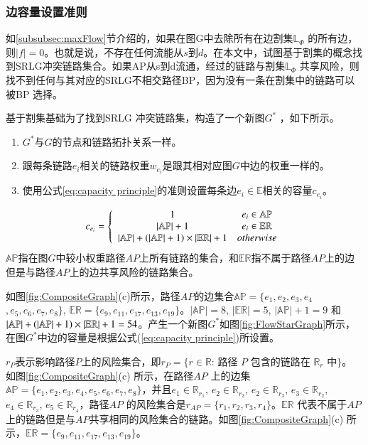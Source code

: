 \subsubsection{边容量设置准则}
如\ref{subsubsec:maxFlow}节介绍的，如果在图G中去除所有在边割集$\mathbb{\mathbb{L}}_{\Phi}$ 的所有边，则$|f| = 0$。也就是说，不存在任何流能从$s$到$d$。在本文中，试图基于割集的概念找到SRLG冲突链路集合。如果AP从s到d流通，经过的链路与割集$\mathbb{\mathbb{L}}_{\Phi}$ 共享风险，则找不到任何与其对应的SRLG不相交路径BP，因为没有一条在割集中的链路可以被BP 选择。

基于割集基础为了找到SRLG 冲突链路集，构造了一个新图$G^*$ ，如下所示。
\begin{enumerate}
  \item $G^*$与$G$的节点和链路拓扑关系一样。
  \item 跟每条链路$e_i$相关的链路权重$w_{e_i}$是跟其相对应图$G$中边的权重一样的。
  \item 使用公式\ref{eq:capacity principle}的准则设置每条边$e_i \in \mathbb{E}$相关的容量$c_{e_i}$。
\end{enumerate}
\begin{equation}
c_{e_i} = \left\{ {\begin{array}{*{20}{c}}
   1 & {e_i{\rm{ }} \in {\rm{ \mathbb{AP}}}}  \\
   {\left| \mathbb{AP} \right|+1} & {e_i{\rm{ }} \in {\rm{ \mathbb{E}}}{{\rm{\mathbb{R}}}}}  \\
   {\left| {{\rm\mathbb{AP}}} \right| + \left( {\left| {{\rm\mathbb{AP}}} \right| + 1} \right)\times \left| {{\rm{\mathbb{E}}}{{\rm{\mathbb{R}}}}} \right| + 1} & {otherwise}  \\
\end{array}} \right.
\label{eq:capacity principle}
\end{equation}
$\mathbb{AP}$指在图$G$中较小权重路径$AP$上所有链路的集合，和$\mathbb{\mathbb{ER}}$指不属于路径$AP$上的边但是与路径$AP$上的边共享风险的链路集合。

如图\ref{fig:CompositeGraph}(c)所示，路径$AP$的边集合$\mathbb{AP}=\{e_1,e_2,e_3,e_4$
$,e_5,e_6,e_7,e_8\}$, $\mathbb{\mathbb{ER}}=\{e_9,e_{11},e_{17},e_{13},e_{19}\}$。$|\mathbb{AP}|=8$, $|\mathbb{\mathbb{ER}}|=5$, $|\mathbb{AP}|+1=9$ 和 ${\left| {{\rm{\mathbb{AP}}}} \right| + \left( {\left| {{\rm{\mathbb{AP}}}} \right| + 1} \right)\times \left| {{\rm{\mathbb{E}}}{{\rm{\mathbb{R}}}}} \right| + 1}=54$。产生一个新图$G^*$如图\ref{fig:FlowStarGraph}所示，在图$G^*$中边的容量是根据公式(\ref{eq:capacity principle})所设置。

$r_P$表示影响路径$P$上的风险集合，即$r_P=\{r\in \mathbb{R}$: 路径 $P$ 包含的链路在 $\mathbb{R}_r$ 中$\}$。 如图\ref{fig:CompositeGraph}(c) 所示，在路径$AP$ 上的边集$\mathbb{AP}=\{e_1,e_2,e_3,e_4,e_5,e_6,e_7,e_8\}$，并且$e_1\in \mathbb{R}_{r_1}$, $e_2\in \mathbb{R}_{r_2}$, $e_2\in \mathbb{R}_{r_3}$, $e_3\in \mathbb{R}_{r_2}$, $e_4\in \mathbb{R}_{r_3}$, $e_5\in \mathbb{R}_{r_4}$，路径$AP$ 的风险集合是${r}_{{AP}}=\{r_1, r_2, r_3, r_4\}$。$\mathbb{\mathbb{ER}}$ 代表不属于$AP$上的链路但是与$AP$共享相同的风险集合的链路。如图\ref{fig:CompositeGraph}(c) 所示，$\mathbb{\mathbb{ER}}=\{e_9,e_{11},e_{17},e_{13},e_{19}\}$。


